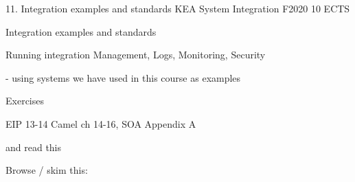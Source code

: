 \documentclass[Screen16to9,17pt]{foils}
\begin{document}
\mytitlepage
{11. Integration examples and standards}
{KEA System Integration F2020 10 ECTS}


\begin{list2}
\item Integration examples and standards
\item Running integration Management, Logs, Monitoring, Security
\item - using systems we have used in this course as examples
\end{list2}

Exercises
\begin{list2}
\item
\item
\end{list2}




\begin{list1}
\item EIP 13-14 Camel ch 14-16, SOA Appendix A

and read this\\

\item Browse / skim this:\\

\end{list1}




\slidenext
\end{document}
